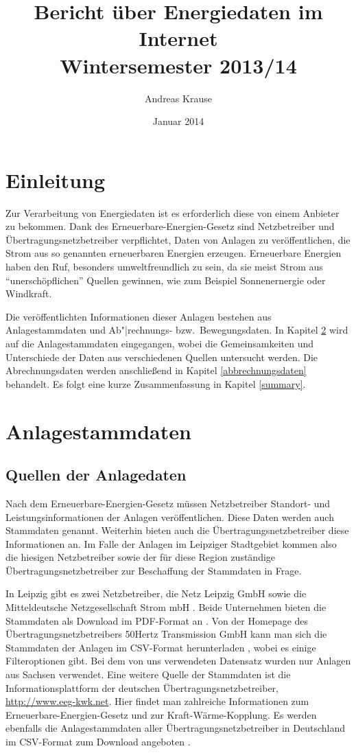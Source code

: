 \documentclass[a4paper,11pt]{article}
\title{Bericht über Energiedaten im Internet\\ Wintersemester 2013/14}
\author{Andreas Krause}
\date{Januar 2014}
\begin{document}
\maketitle

\section{Einleitung}
Zur Verarbeitung von Energiedaten ist es erforderlich diese von einem Anbieter
zu bekommen. Dank des Erneuerbare-Energien-Gesetz sind Netzbetreiber und
Übertragungsnetzbetreiber verpflichtet, Daten von Anlagen zu veröffentlichen,
die Strom aus so genannten erneuerbaren Energien erzeugen. Erneuerbare
Energien haben den Ruf, besonders umweltfreundlich zu sein, da sie meist Strom
aus ``unerschöpflichen'' Quellen gewinnen, wie zum Beispiel Sonnenernergie
oder Windkraft.

Die veröffentlichten Informationen dieser Anlagen bestehen aus
Anlagestammdaten und Ab"|rechnungs- bzw.\ Bewegungsdaten. In Kapitel
\ref{anlagestammdaten} wird auf die Anlagestammdaten eingegangen, wobei die
Gemeinsamkeiten und Unterschiede der Daten aus verschiedenen Quellen
untersucht werden. Die Abrechnungsdaten werden anschließend in Kapitel
\ref{abbrechnungsdaten} behandelt. Es folgt eine kurze Zusammenfassung in
Kapitel \ref{summary}.

\section{Anlagestammdaten}
\label{anlagestammdaten}

\subsection{Quellen der Anlagedaten}
Nach dem Erneuerbare-Energien-Gesetz müssen Netzbetreiber Standort- und
Leistungsinformationen der Anlagen veröffentlichen. Diese Daten werden auch
Stammdaten genannt. Weiterhin bieten auch die Übertragungsnetzbetreiber
diese Informationen an. Im Falle der Anlagen im Leipziger Stadtgebiet kommen
also die hiesigen Netzbetreiber sowie der für diese Region zuständige
Übertragungsnetzbetreiber zur Beschaffung der Stammdaten in Frage. 

In Leipzig gibt es zwei Netzbetreiber, die Netz Leipzig GmbH \cite{netzle}
sowie die Mitteldeutsche Netzgesellschaft Strom mbH \cite{mitnetz}. Beide
Unternehmen bieten die Stammdaten als Download im PDF-Format an
\cite{netzle-stammdaten, mitnetz-stammdaten}.  Von der Homepage des
Übertragungsnetzbetreibers 50Hertz Transmission GmbH kann man sich die
Stammdaten der Anlagen im CSV-Format herunterladen \cite{50hertz}, wobei es
einige Filteroptionen gibt. Bei dem von uns verwendeten Datensatz wurden nur
Anlagen aus Sachsen verwendet. Eine weitere Quelle der Stammdaten ist die
Informationsplattform der deutschen Übertragungsnetzbetreiber,
\url{http://www.eeg-kwk.net}. Hier findet man zahlreiche Informationen zum
Erneuerbare-Energien-Gesetz und zur Kraft-Wärme-Kopplung. Es werden ebenfalls
die Anlagestammdaten aller Übertragungsnetzbetreiber in Deutschland im
CSV-Format zum Download angeboten \cite{eegkwk-stammdaten}.
\end{document}
